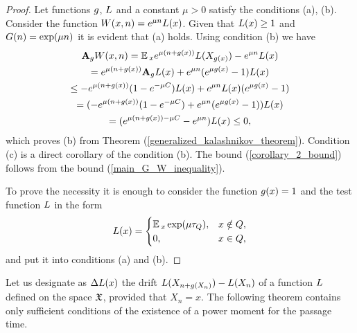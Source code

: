 	\begin{proof}
		Let functions $g$, $L$ and a constant $\mu > 0$ satisfy the conditions (a), (b). Consider the function $W(x, n) = e^{\mu n}L(x)$. Given that $L(x) \geq 1$ and $G(n) = \exp(\mu n)$ it is evident that (a) holds. Using condition (b) we have
		\begin{gather*}
		\mathbf{A}_{g}W(x, n) = \operatorname*{\mathbb{E}}{}_{x}e^{\mu(n + g(x))}L(X_{g(x)}) - e^{\mu n}L(x) \\ = e^{\mu(n + g(x))}\mathbf{A}_{g}L(x) + e^{\mu n}(e^{\mu g(x)} - 1)L(x) \\ \leq -e^{\mu(n + g(x))}(1 - e^{-\mu C})L(x) + e^{\mu n}L(x)(e^{\mu g(x)} - 1) \\ = (-e^{\mu(n + g(x))}(1 - e^{-\mu C}) + e^{\mu n}(e^{\mu g(x)} - 1))L(x) \\ = (e^{\mu(n + g(x)) - \mu C} - e^{\mu n})L(x) \leq 0,
		\end{gather*}
		which proves (b) from Theorem (\ref{generalized_kalashnikov_theorem}). Condition (c) is a direct corollary of the condition (b). The bound (\ref{corollary_2_bound}) follows from the bound (\ref{main_G_W_inequality}).
		
		To prove the necessity it is enough to consider the function $g(x) = 1$ and the test function $L$ in the form
		\begin{gather*}
		L(x) = \begin{cases}
		\operatorname*{\mathbb{E}}{}_{x}\exp(\mu\tau_{Q}), & x \notin Q,\\
		0, & x \in Q,
		\end{cases}
		\end{gather*}
		and put it into conditions (a) and (b).
	\end{proof}
	
	Let us designate as $\Delta L(x)$ the drift $L(X_{n + g(X_{n})}) - L(X_{n})$ of a function $L$ defined on the space $\mathfrak{X}$, provided that $X_{n} = x$. The following theorem contains only sufficient conditions of the existence of a power moment for the passage time.
	
